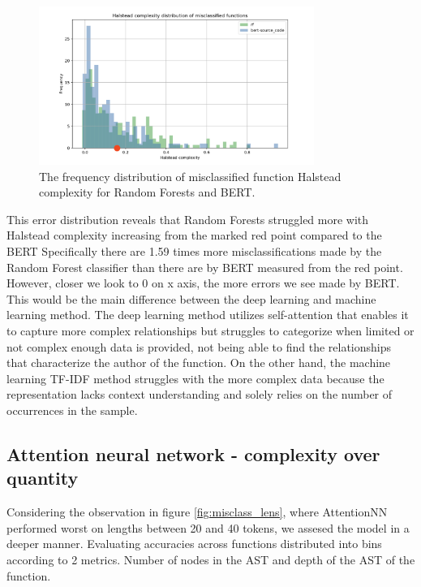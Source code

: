\documentclass{article}
\begin{document}
\begin{figure}[H] 
    \centering
    \includegraphics[width=0.8\textwidth]{figures/misclass_hs.png}
    \caption{The frequency distribution of misclassified function Halstead complexity for Random Forests and BERT.}
    \label{fig:misclass_halstead}
\end{figure}

This error distribution reveals that Random Forests struggled more with Halstead complexity increasing from the marked red point compared to the BERT 
Specifically there are 1.59 times more misclassifications made by the Random Forest classifier than there are by BERT measured from the red point.
However, closer we look to 0 on x axis, the more errors we see made by BERT. This would be the main difference between the deep learning and 
machine learning method. The deep learning method utilizes self-attention that enables it to capture more complex relationships but struggles
to categorize when limited or not complex enough data is provided, not being able to find the relationships that characterize the author of the function. 
On the other hand, the machine learning TF-IDF method struggles with the more complex data because the representation lacks context understanding and solely 
relies on the number of occurrences in the sample.

\subsection{Attention neural network - complexity over quantity}  \label{subsec:comp_over_quant}

Considering the observation in figure \ref{fig:misclass_lens}, where AttentionNN performed worst on lengths between 20 and 40 tokens,
we assesed the model in a deeper manner. Evaluating accuracies across functions distributed into bins according to 2 metrics. 
Number of nodes in the AST and depth of the AST of the function. 
\end{document}
